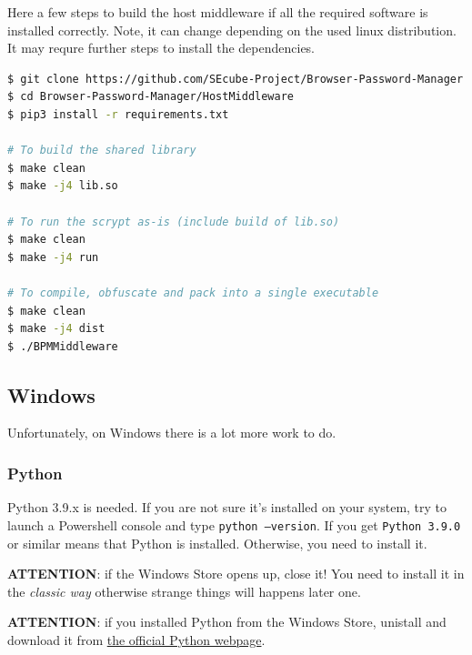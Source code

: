 Here a few steps to build the host middleware if all the required software is installed correctly. Note, it can change depending on the used linux distribution. It may requre further steps to install the dependencies.

\begin{lstlisting}[language=bash,caption={bash version}]
$ git clone https://github.com/SEcube-Project/Browser-Password-Manager.git
$ cd Browser-Password-Manager/HostMiddleware
$ pip3 install -r requirements.txt

# To build the shared library
$ make clean
$ make -j4 lib.so

# To run the scrypt as-is (include build of lib.so)
$ make clean
$ make -j4 run

# To compile, obfuscate and pack into a single executable
$ make clean
$ make -j4 dist
$ ./BPMMiddleware

\end{lstlisting}


\subsection{Windows}
Unfortunately, on Windows there is a lot more work to do.

\subsubsection{Python}
Python 3.9.x is needed. If you are not sure it's installed on your system, try to launch a Powershell console and type \texttt{python --version}. If you get \texttt{Python 3.9.0} or similar means that Python is installed. Otherwise, you need to install it. \\

\begin{warning}
\textbf{ATTENTION}: if the Windows Store opens up, close it! You need to install it in the \textit{classic way} otherwise strange things will happens later one. 
\end{warning}

\begin{warning}
\textbf{ATTENTION}: if you installed Python from the Windows Store, unistall and download it from \href{https://www.python.org/downloads/release/python-390/}{the official Python webpage}.
\end{warning}

